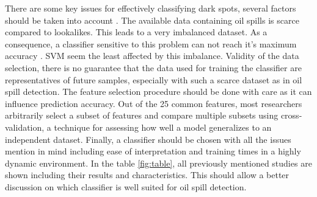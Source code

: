 There are some key issues for effectively classifying dark spots, several factors should be taken into account \cite{Kubat:1998:MLD:288808.288812}. The available data containing oil spills is scarce compared to lookalikes. This leads to a very imbalanced dataset. As a consequence, a classifier sensitive to this problem can not reach it's maximum accuracy \cite{Japkowicz20026}. SVM seem the least affected by this imbalance. Validity of the data selection, there is no guarantee that the data used for training the classifier are representatives of future samples, especially with such a scarce dataset as in oil spill detection. The feature selection procedure should be done with care as it can influence prediction accuracy. Out of the 25 common features, most researchers arbitrarily select a subset of features and compare multiple subsets using cross-validation, a technique for assessing how well a model generalizes to an independent dataset. Finally, a classifier should be chosen with all the issues mention in mind including ease of interpretation and training times in a highly dynamic environment. In the table \ref{fig:table}, all previously mentioned studies are shown including their results and characteristics. This should allow a better discussion on which classifier is well suited for oil spill detection.

